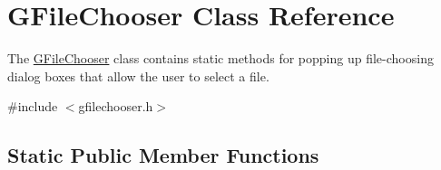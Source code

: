 \hypertarget{classGFileChooser}{}\section{G\+File\+Chooser Class Reference}
\label{classGFileChooser}


The \mbox{\hyperlink{classGFileChooser}{G\+File\+Chooser}} class contains static methods for popping up file-\/choosing dialog boxes that allow the user to select a file.  




{\ttfamily \#include $<$gfilechooser.\+h$>$}

\subsection*{Static Public Member Functions}
